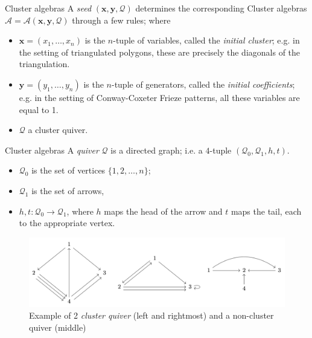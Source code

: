 \documentclass{beamer}
\begin{document}

\begin{frame}{Cluster algebras}
     A \emph{seed} $(\mathbf{x},\mathbf{y},\mathcal{Q})$ determines the corresponding Cluster algebras $\mathcal{A} = \mathcal{A}(\mathbf{x},\mathbf{y},\mathcal{Q})$ through a few rules; where
     \pause
    \begin{itemize}
        \item $\mathbf{x}=(x_1,\dots,x_n)$ is the   $n$-tuple of variables, called the \emph{initial cluster}; e.g. in the setting of triangulated polygons, these are precisely the diagonals of the triangulation.
        \pause
        \item $\mathbf{y}=(y_1,\dots,y_n)$ is the $n$-tuple of generators, called the \emph{initial coefficients}; e.g. in the setting of Conway-Coxeter Frieze patterns, all these variables are equal to 1. 
        \pause
        \item $\mathcal{Q}$ a cluster quiver.
    \end{itemize}
\end{frame}

\begin{frame}{Cluster algebras}
    A \emph{quiver} $\mathcal{Q}$ is a directed graph; i.e. a $4$-tuple $(\mathcal{Q}_0, \mathcal{Q}_1, h, t)$.
    \begin{itemize}
        \item $\mathcal{Q}_0$ is the set of vertices $\{1,2,\dots, n\}$;
        \item $\mathcal{Q}_1$ is the set of arrows,
        \item $h,t : \mathcal{Q}_0 \to \mathcal{Q}_1$, where $h$ maps the head of the arrow and $t$ maps the tail, each to the appropriate vertex.
    \end{itemize}
    \pause
\begin{figure}[H]
    \centering
    \includegraphics[width = 11 cm]{Images/quivers.png}
    \caption{Example of 2 \emph{cluster quiver} (left and rightmost) and a non-cluster quiver (middle)}
    \label{fig:my_label}
\end{figure}
\end{frame}
\end{document}
